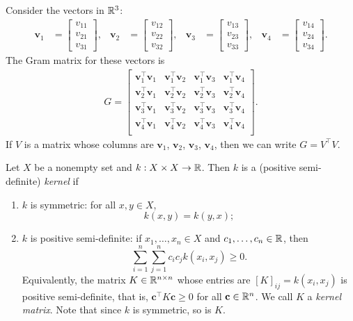 \begin{example}
    \def\v{\mathbf{v}}
    Consider the vectors in \(\mathbb{R}^3\):
    \begin{align*}
        \v_1 &=
        \begin{bmatrix}
            v_{11} \\ v_{21} \\ v_{31}
        \end{bmatrix},&
        \v_2 &=
        \begin{bmatrix}
            v_{12} \\ v_{22} \\ v_{32}
        \end{bmatrix},&
        \v_3 &=
        \begin{bmatrix}
            v_{13} \\ v_{23} \\ v_{33}
        \end{bmatrix},&
        \v_4 &=
        \begin{bmatrix}
            v_{14} \\ v_{24} \\ v_{34}
        \end{bmatrix}.
    \end{align*}
    The Gram matrix for these vectors is
    \begin{align*}
        G = \begin{bmatrix}
            \v_1^\top \v_1 & \v_1^\top \v_2 & \v_1^\top \v_3 & \v_1^\top \v_4\\[3pt]
            \v_2^\top \v_1 & \v_2^\top \v_2 & \v_2^\top \v_3 & \v_2^\top \v_4\\[3pt]
            \v_3^\top \v_1 & \v_3^\top \v_2 & \v_3^\top \v_3 & \v_3^\top \v_4\\[3pt]
            \v_4^\top \v_1 & \v_4^\top \v_2 & \v_4^\top \v_3 & \v_4^\top \v_4\\
        \end{bmatrix}.
    \end{align*}
    If \(V\) is a matrix whose columns are \(\v_1\), \(\v_2\), \(\v_3\), \(\v_4\), then we can write \(G = V^\top V\).
\end{example}

\begin{definition}[kernel]
    Let \(X\) be a nonempty set and \(k : X \times X \to \mathbb{R}\).
    Then \(k\) is a (positive semi-definite) \textit{kernel} if
    \begin{enumerate}
        \item \(k\) is symmetric: for all \(x,y \in X\),
        \[k(x,y) = k(y,x);\]
        \item \(k\) is positive semi-definite: if \(x_1, \dots, x_n \in X\) and \(c_1, \dots, c_n \in \mathbb{R}\), then
        \[\sum_{i=1}^{n}\sum_{j=1}^{n} c_i c_j k(x_i, x_j) \geq 0.\]
        Equivalently, the matrix \(K \in \mathbb{R}^{n \times n}\) whose entries are \([K]_{ij} = k(x_i, x_j)\) is positive semi-definite, that is, \(\mathbf{c}^\top K \mathbf{c} \geq 0\) for all \(\mathbf{c} \in \mathbb{R}^n\).
        We call \(K\) a \textit{kernel matrix}.
        Note that since \(k\) is symmetric, so is \(K\).
    \end{enumerate}
\end{definition}

